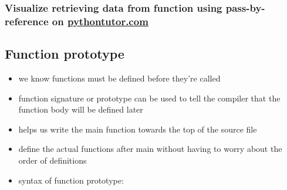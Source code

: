 \documentclass[11pt]{article}
\providecommand{\tightlist}{%
      \setlength{\itemsep}{0pt}\setlength{\parskip}{0pt}}
\begin{document}
    \hypertarget{visualize-retrieving-data-from-function-using-pass-by-reference-on-pythontutor.com}{%
\subsubsection{\texorpdfstring{Visualize retrieving data from function
using pass-by-reference on
\href{http://pythontutor.com/cpp.html\#code=//\%20pass\%20by\%20value\%20demo\%0A\%23include\%20\%3Ciostream\%3E\%0Ausing\%20namespace\%20std\%3B\%0A\%0A//\%20extracting\%20value\%20from\%20a\%20function\%20with\%20passed\%20by\%20reference\%20technique\%0A//\%20num1\%20is\%20passed\%20by\%20value\%20num\%202\%20and\%20sum\%20are\%20passed\%20by\%20reference\%0Avoid\%20computeSum\%28int\%20num1,\%20int\%26\%20num2,\%20long\%20\%26sum\%29\%20\%7B\%0A\%20\%20\%20\%20sum\%20\%3D\%20num1\%20\%2B\%20num2\%3B\%20//\%20sum\%20is\%20modified\%0A\%20\%20\%20\%20//\%20notice\%20void\%20function,\%20no\%20return\%20value!\%0A\%7D\%0A\%0Aint\%20main\%28\%29\%20\%7B\%0A\%20\%20int\%20n1,\%20n2\%3B\%0A\%20\%20n1\%20\%3D\%2020\%3B\%0A\%20\%20n2\%20\%3D\%2030\%3B\%0A\%20\%20long\%20ans\%20\%3D\%200\%3B\%0A\%20\%20computeSum\%28n1,\%20n2,\%20ans\%29\%3B\%0A\%20\%20cout\%20\%3C\%3C\%20n1\%20\%3C\%3C\%20\%22\%20\%2B\%20\%22\%20\%3C\%3C\%20n2\%20\%3C\%3C\%20\%22\%20\%3D\%20\%22\%20\%3C\%3C\%20ans\%20\%3C\%3C\%20endl\%3B\%0A\%20\%20return\%200\%3B\%0A\%7D\&curInstr=0\&mode=display\&origin=opt-frontend.js\&py=cpp\&rawInputLstJSON=\%5B\%5D}{pythontutor.com}}{Visualize retrieving data from function using pass-by-reference on pythontutor.com}}\label{visualize-retrieving-data-from-function-using-pass-by-reference-on-pythontutor.com}}

    \hypertarget{function-prototype}{%
\subsection{Function prototype}\label{function-prototype}}

\begin{itemize}
\tightlist
\item
  we know functions must be defined before they're called
\item
  function signature or prototype can be used to tell the compiler that
  the function body will be defined later
\item
  helps us write the main function towards the top of the source file
\item
  define the actual functions after main without having to worry about
  the order of definitions
\item
  syntax of function prototype:
\end{itemize}
\end{document}
